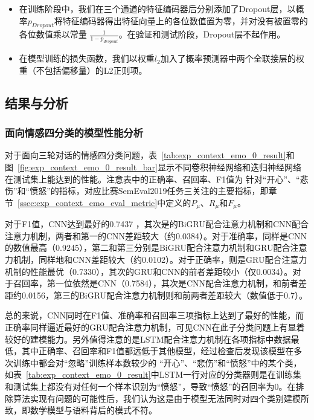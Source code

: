 \begin{itemize}
\item 在训练阶段中，我们在三个通道的特征编码器后分别添加了Dropout层，以概率$p_{Dropout}$将特征编码器得出特征向量上的各位数值置为零，并对没有被置零的各位数值乘以常量 $\frac{1}{1-p_{dropout}}$。在验证和测试阶段，Dropout层不起作用。

\item 在模型训练的损失函数，我们以权重$l_2$加入了概率预测器中两个全联接层的权重（不包括偏移量）的L2正则项。

\end{itemize}

\subsection{结果与分析}

\subsubsection{面向情感四分类的模型性能分析}
\label{sssec:exp_context_emo_0_base}

对于面向三轮对话的情感四分类问题，表~\ref{tab:exp_context_emo_0_result}和图~\ref{fig:exp_context_emo_0_result_bar}显示不同卷积神经网络和迭归神经网络在测试集上能达到的性能。注意表中的正确率、召回率、F1值为
针对“开心”、“悲伤”和“愤怒”的指标，对应比赛SemEval2019任务三关注的主要指标，即章节~\ref{ssec:exp_context_emo_eval_metric}中定义的$P_\mu$、$R_\mu$和$F_\mu$。

对于F1值，CNN达到最好的0.7437 ，其次是的BiGRU配合注意力机制和CNN配合注意力机制，两者和第一的CNN差距较大（约0.0384）。对于准确率，同样是CNN的数值最高（0.9245），第二和第三分别是BiGRU配合注意力机制和GRU配合注意力机制，同样地和CNN差距较大（约0.0102）。对于正确率，则是GRU配合注意力机制的性能最优（0.7330），其次的GRU和CNN的前者差距较小（仅0.0034）。对于召回率，第一位依然是CNN（0.7584），其次是CNN配合注意力机制，和前者差距约0.0156，第三的BiGRU配合注意力机制则和前两者差距较大（数值低于0.7）。

总的来说，CNN同时在F1值、准确率和召回率三项指标上达到了最好的性能，而正确率同样逼近最好的GRU配合注意力机制，可见CNN在此子分类问题上有显着较好的建模能力。另外值得注意的是LSTM配合注意力机制在各项指标中数据最低，其中正确率、召回率和F1值都远低于其他模型，经过检查后发现该模型在多次训练中都会对“忽略”训练样本数较少的
“开心”、“悲伤”和“愤怒”中的某个类，如表~\ref{tab:exp_context_emo_0_result}中LSTM一行对应的分类器则是在训练集和测试集上都没有对任何一个样本识别为“愤怒”，导致“愤怒”的召回率为0。在排除算法实现有问题的可能性后，我们认为这是由于模型无法同时对四个类别建模所致，即数学模型与语料背后的模式不符。

